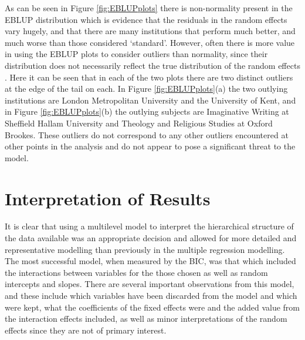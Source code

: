 \documentclass[11pt,a4paper]{report}
\begin{document}
		
As can be seen in Figure \ref{fig:EBLUPplots} there is non-normality present in the EBLUP distribution which is evidence that the residuals in the random effects vary hugely, and that there are many institutions that perform much better, and much worse than those considered `standard'. However, often there is more value in using the EBLUP plots to consider outliers than normality, since their distribution does not necessarily reflect the true distribution of the random effects \cite{LinearMMs}. Here it can be seen that in each of the two plots there are two distinct outliers at the edge of the tail on each. In Figure \ref{fig:EBLUPplots}(a) the two outlying institutions are London Metropolitan University and the University of Kent, and in Figure \ref{fig:EBLUPplots}(b) the outlying subjects are Imaginative Writing at Sheffield Hallam University and Theology and Religious Studies at Oxford Brookes. These outliers do not correspond to any other outliers encountered at other points in the analysis and do not appear to pose a significant threat to the model. 

\newpage
\section{Interpretation of Results}
It is clear that using a multilevel model to interpret the hierarchical structure of the data available was an appropriate decision and allowed for more detailed and representative modelling than previously in the multiple regression modelling. The most successful model, when measured by the BIC, was that which included the interactions between variables for the those chosen as well as random intercepts and slopes.
There are several important observations from this model, and these include which variables have been discarded from the model and which were kept, what the coefficients of the fixed effects were and the added value from the interaction effects included, as well as minor interpretations of the random effects since they are not of primary interest.  
\end{document}
